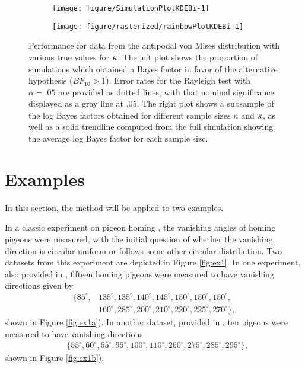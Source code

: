 \begin{figure}
  \begin{subfigure}[t]{0.5\linewidth}\centering
\begin{knitrout}
\color{fgcolor}
\texttt{[image: figure/SimulationPlotKDEBi-1]} 

\end{knitrout}
    \caption{}\label{fig:simKDEBierror}
  \end{subfigure}%
  \begin{subfigure}[t]{0.5\linewidth}\centering
\begin{knitrout}
\color{fgcolor}
\texttt{[image: figure/rasterized/rainbowPlotKDEBi-1]} 

\end{knitrout}
    \caption{}\label{fig:simKDEBibfs}
  \end{subfigure}
  \caption{Performance for data from the antipodal von Mises distribution with various true values for \( \kappa \). The left plot shows the proportion of simulations which obtained a Bayes factor in favor of the alternative hypothesis (\(BF_{10} > 1\)). Error rates for the Rayleigh test with \(\alpha = .05\) are provided as dotted lines, with that nominal significance displayed as a gray line at \(.05\). The right plot shows a subsample of the log Bayes factors obtained for different sample sizes \(n\) and \(\kappa\), as well as a solid trendline computed from the full simulation showing the average log Bayes factor for each sample size.}\label{fig:simKDEBi}
\end{figure}



\section{Examples} \label{sec:ex}
In this section, the method will be applied to two examples. 

In a classic experiment on pigeon homing \citep{schmidt1963role}, the vanishing angles of homing pigeons were measured, with the initial question of whether the vanishing direction is circular uniform or follows some other circular distribution. Two datasets from this experiment are depicted in Figure \ref{fig:ex1}. In one experiment, also provided in \citet{fisher1995statistical}, fifteen homing pigeons were measured to have vanishing directions given by 
\begin{align*}
\{ 85^\circ, &135^\circ, 135^\circ, 140^\circ, 145^\circ, 150^\circ, 150^\circ, 150^\circ, \\ &160^\circ, 285^\circ, 200^\circ, 210^\circ, 220^\circ, 225^\circ, 270^\circ \},
\end{align*} 
shown in  Figure \ref{fig:ex1a}). In another dataset, provided in \citet{mardia2009directional}, ten pigeons were measured to have vanishing directions 
\begin{align*}
&\{ 55^\circ, 60^\circ, 65^\circ, 95^\circ, 100^\circ, 110^\circ, 260^\circ, 275^\circ, 285^\circ, 295^\circ\},
\end{align*} 
 shown in Figure \ref{fig:ex1b}).

